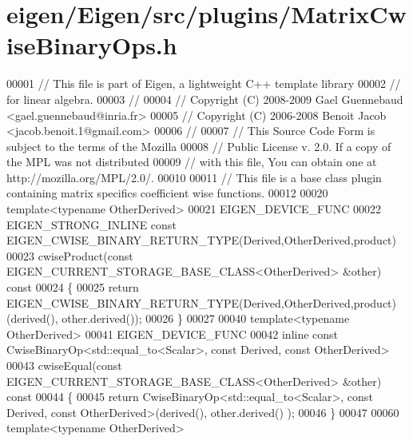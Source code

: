 \hypertarget{eigen_2_eigen_2src_2plugins_2_matrix_cwise_binary_ops_8h_source}{}\section{eigen/\+Eigen/src/plugins/\+Matrix\+Cwise\+Binary\+Ops.h}
\label{eigen_2_eigen_2src_2plugins_2_matrix_cwise_binary_ops_8h_source}

\begin{DoxyCode}
00001 \textcolor{comment}{// This file is part of Eigen, a lightweight C++ template library}
00002 \textcolor{comment}{// for linear algebra.}
00003 \textcolor{comment}{//}
00004 \textcolor{comment}{// Copyright (C) 2008-2009 Gael Guennebaud <gael.guennebaud@inria.fr>}
00005 \textcolor{comment}{// Copyright (C) 2006-2008 Benoit Jacob <jacob.benoit.1@gmail.com>}
00006 \textcolor{comment}{//}
00007 \textcolor{comment}{// This Source Code Form is subject to the terms of the Mozilla}
00008 \textcolor{comment}{// Public License v. 2.0. If a copy of the MPL was not distributed}
00009 \textcolor{comment}{// with this file, You can obtain one at http://mozilla.org/MPL/2.0/.}
00010 
00011 \textcolor{comment}{// This file is a base class plugin containing matrix specifics coefficient wise functions.}
00012 
00020 \textcolor{keyword}{template}<\textcolor{keyword}{typename} OtherDerived>
00021 EIGEN\_DEVICE\_FUNC
00022 EIGEN\_STRONG\_INLINE \textcolor{keyword}{const} EIGEN\_CWISE\_BINARY\_RETURN\_TYPE(Derived,OtherDerived,product)
00023 cwiseProduct(\textcolor{keyword}{const} EIGEN\_CURRENT\_STORAGE\_BASE\_CLASS<OtherDerived> &other)\textcolor{keyword}{ const}
00024 \textcolor{keyword}{}\{
00025   \textcolor{keywordflow}{return} EIGEN\_CWISE\_BINARY\_RETURN\_TYPE(Derived,OtherDerived,product)(derived(), other.derived());
00026 \}
00027 
00040 \textcolor{keyword}{template}<\textcolor{keyword}{typename} OtherDerived>
00041 EIGEN\_DEVICE\_FUNC
00042 \textcolor{keyword}{inline} \textcolor{keyword}{const} CwiseBinaryOp<std::equal\_to<Scalar>, \textcolor{keyword}{const} Derived, \textcolor{keyword}{const} OtherDerived>
00043 cwiseEqual(\textcolor{keyword}{const} EIGEN\_CURRENT\_STORAGE\_BASE\_CLASS<OtherDerived> &other)\textcolor{keyword}{ const}
00044 \textcolor{keyword}{}\{
00045   \textcolor{keywordflow}{return} CwiseBinaryOp<std::equal\_to<Scalar>, \textcolor{keyword}{const} Derived, \textcolor{keyword}{const} OtherDerived>(derived(), other.derived()
      );
00046 \}
00047 
00060 \textcolor{keyword}{template}<\textcolor{keyword}{typename} OtherDerived>

\end{DoxyCode}
